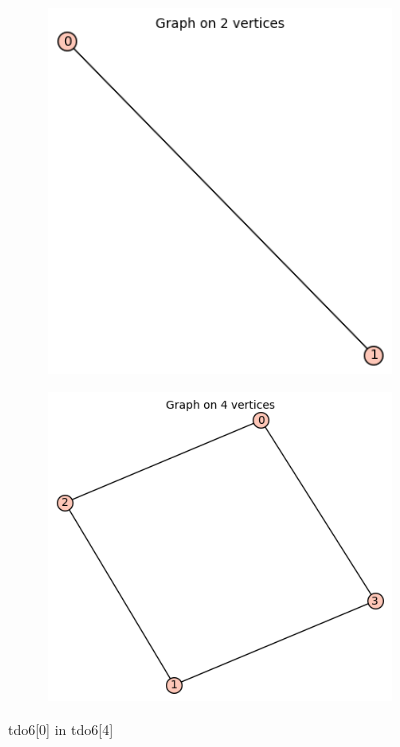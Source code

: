 \documentclass[12pt, a4paper]{article}
\begin{document}
\begin{center}
\begin{figure}[!htb]
\centering
\begin{subfigure}{0.5\textwidth}
  \centering
  \includegraphics[width=0.4\linewidth]{tdo6[0]}
\end{subfigure}%
\begin{subfigure}{0.5\textwidth}
  \centering
  \includegraphics[width=0.5\linewidth]{tdo6[4]}
\end{subfigure}
\caption{tdo6[0] in tdo6[4]}
\label{fig:test}
\end{figure}


\end{center}
\end{document}
